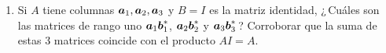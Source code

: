 \documentclass[12pt,a4paper]{article}
\newcommand{\bi}[1]{\hbox{\boldmath$#1$}}
\newcommand\1{\mbox{\,\vrule height-0.8pt depth1.0pt width2pc\,}}
\newcommand\2{\mbox{\,\vrule height-0.8pt depth1.0pt width1pc\,}}
\begin{document}
\begin{enumerate}
Verifique que $\bi{(AB)C = A(BC)}$ para
$A=\left[\begin{array}{@{\;}cc@{\;}}1&a\\0&1\\\end{array}\right]\quad B=\left[\begin{array}{@{\;}cc@{\;}}b_1&b_2\\b_3&b_4\\\end{array}\right]\quad C=\left[\begin{array}{@{\;}cc@{\;}}1&0\\c&1\\\end{array}\right]$.

\item Si $A$ tiene columnas $\bi{a}_{1}, \bi{a}_{2}, \bi{a}_{3}$ y $B=I$ es la matriz identidad, ¿\,Cuáles son las matrices de rango uno $\bi{a}_{1}\bi{b}_{1}^{*}$, $\bi{a}_{2}\bi{b}_{2}^{*}$ y $\bi{a}_{3}\bi{b}_{3}^{*}$\,? Corroborar que la suma de estas 3 matrices coincide con el producto 
$AI=A$.


\end{enumerate}
\end{document}

